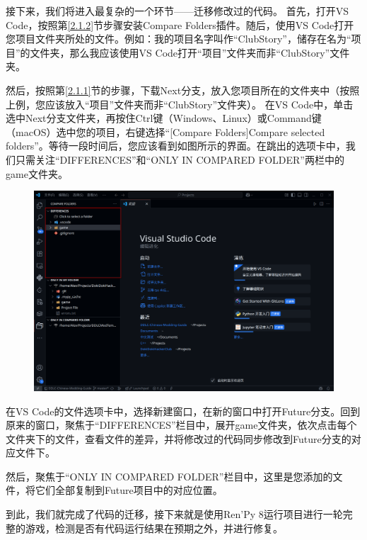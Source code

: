 接下来，我们将进入最复杂的一个环节——迁移修改过的代码。
首先，打开VS Code，按照第\ref{2.1.2}节步骤安装Compare Folders插件。随后，使用VS Code打开您项目文件夹所处的文件。例如：我的项目名字叫作“ClubStory”，储存在名为“项目”的文件夹，那么我应该使用VS Code打开“项目”文件夹而非“ClubStory”文件夹。

然后，按照第\ref{2.1.1}节的步骤，下载Next分支，放入您项目所在的文件夹中（按照上例，您应该放入“项目”文件夹而非“ClubStory”文件夹）。
在VS Code中，单击选中Next分支文件夹，再按住Ctrl键（Windows、Linux）或Command键（macOS）选中您的项目，右键选择“[Compare Folders]Compare selected folders”。等待一段时间后，您应该看到如图所示的界面。在跳出的选项卡中，我们只需关注“DIFFERENCES”和“ONLY IN COMPARED FOLDER”两栏中的game文件夹。
\begin{figure}[htbp]
    \centering
    \includegraphics[scale=.2]{Pictures/7.1.2.1.png}
\end{figure}

在VS Code的文件选项卡中，选择新建窗口，在新的窗口中打开Future分支。回到原来的窗口，聚焦于“DIFFERENCES”栏目中，展开game文件夹，依次点击每个文件夹下的文件，查看文件的差异，并将修改过的代码同步修改到Future分支的对应文件下。

然后，聚焦于“ONLY IN COMPARED FOLDER”栏目中，这里是您添加的文件，将它们全部复制到Future项目中的对应位置。

到此，我们就完成了代码的迁移，接下来就是使用Ren'Py 8运行项目进行一轮完整的游戏，检测是否有代码运行结果在预期之外，并进行修复。